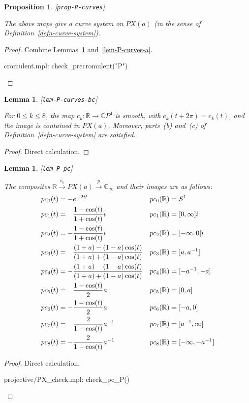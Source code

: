\documentclass[reqno]{amsart}
\newcommand{\lbl}[1]{\label{#1}\textup{[\texttt{#1}]}\par}
\newcommand{\lbl}{\label}
\newcommand{\xra}       {\xrightarrow}
\newcommand{\R}         {{\mathbb{R}}}
\newcommand{\C}         {{\mathbb{C}}}
\newcommand{\pp}        {\hphantom{+}}
\renewcommand{\:}{\colon}
\newtheorem{lemma}[theorem]{Lemma}
\newtheorem{proposition}[theorem]{Proposition}
\theoremstyle{definition}
\begin{document}
\begin{proposition}\lbl{prop-P-curves}
 The above maps give a curve system on $PX(a)$ (in the sense of
 Definition~\ref{defn-curve-system}).
\end{proposition}
\begin{proof}
 Combine Lemmas~\ref{lem-P-curves-bc} and~\ref{lem-P-curves-a}.
 \begin{checks}
  cromulent.mpl: check_precromulent("P")
 \end{checks}
\end{proof}

\begin{lemma}\lbl{lem-P-curves-bc}
 For $0\leq k\leq 8$, the map $c_k\:\R\to\C P^4$ is smooth, with
 $c_k(t+2\pi)=c_k(t)$, and the image is contained in $PX(a)$.
 Moreover, parts~(b) and~(c) of Definition~\ref{defn-curve-system} are
 satisfied.
\end{lemma}
\begin{proof}
 Direct calculation.
\end{proof}

\begin{lemma}\lbl{lem-P-pc}
 The composites $\R\xra{c_k}PX(a)\xra{p}\C_\infty$ and their images
 are as follows:
 \begin{align*}
  pc_0(t) &= - e^{-2it} &
  pc_0(\R) &= S^1 \\
  pc_1(t) &= \pp\frac{1-\cos(t)}{1+\cos(t)}i &
  pc_1(\R) &= [0,\infty] i \\
  pc_2(t) &= -\frac{1-\cos(t)}{1+\cos(t)}i &
  pc_2(\R) &= [-\infty,0] i \\
  pc_3(t) &= \pp\frac{(1+a)-(1-a)\cos(t)}{(1+a)+(1-a)\cos(t)} &
  pc_3(\R) &= [a,a^{-1}] \\
  pc_4(t) &= -\frac{(1+a)-(1-a)\cos(t)}{(1+a)+(1-a)\cos(t)} &
  pc_4(\R) &= [-a^{-1},-a] \\
  pc_5(t) &= \pp\frac{1-\cos(t)}{2}a &
  pc_5(\R) &= [0,a] \\
  pc_6(t) &= -\frac{1-\cos(t)}{2}a &
  pc_6(\R) &= [-a,0] \\
  pc_7(t) &= \pp\frac{2}{1-\cos(t)}a^{-1} &
  pc_7(\R) &= [a^{-1},\infty] \\
  pc_8(t) &= -\frac{2}{1-\cos(t)}a^{-1} &
  pc_8(\R) &= [-\infty,-a^{-1}] \\
 \end{align*}
\end{lemma}
\begin{proof}
 Direct calculation.
 \begin{checks}
  projective/PX_check.mpl: check_pc_P()
 \end{checks}
\end{proof}
\end{document}
